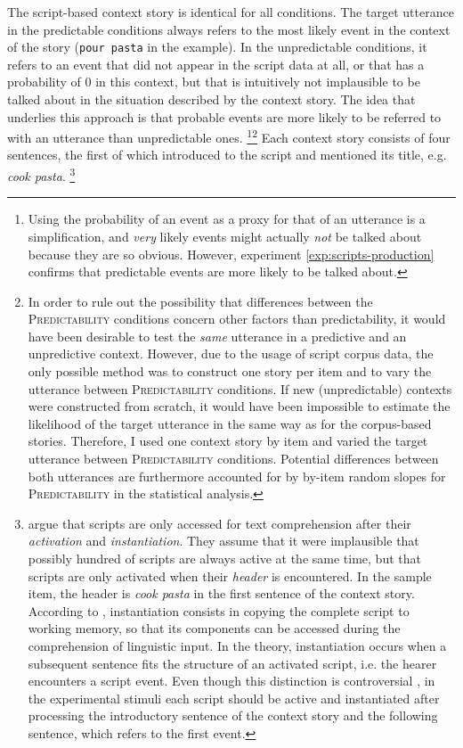 The script-based context story is identical for all conditions. The target utterance in the predictable conditions always refers to the most likely event in the context of the story (\texttt{pour pasta} in the example). In the unpredictable conditions, it refers to an event that did not appear in the script data at all, or that has a probability of 0 in this context, but that is intuitively not implausible to be talked about in the situation described by the context story. The idea that underlies this approach is that probable events are more likely to be referred to with an utterance than unpredictable ones.\largerpage%
%
\footnote{Using the probability of an event as a proxy for that of an utterance is a simplification, and \textit{very} likely events might actually \textit{not} be talked about because they are so obvious. However, experiment \ref{exp:scripts-production} confirms that predictable events are more likely to be talked about.}\footnote{In order to rule out the possibility that differences between the \textsc{Predictability} conditions concern other factors than predictability, it would have been desirable to test the \textit{same} utterance in a predictive and an unpredictive context. However, due to the usage of script corpus data, the only possible method was to construct one story per item and to vary the utterance between \textsc{Predictability} conditions. If new (unpredictable) contexts were constructed from scratch, it would have been impossible to estimate the likelihood of the target utterance in the same way as for the corpus-based stories. Therefore, I used one context story by item and varied the target utterance between \textsc{Predictability} conditions. Potential differences between both utterances are furthermore accounted for by by-item random slopes for \textsc{Predictability} in the statistical analysis.}\afterfn%
%
Each context story consists of four sentences, the first of which introduced to the script and mentioned its title, e.g. \textit{cook pasta}.%
% 
\footnote{\citet{schank.abelson1977} argue that scripts are only accessed for text comprehension after their \textit{activation} and \textit{instantiation}. They assume that it were implausible that possibly hundred of scripts are always active at the same time, but that scripts are only activated when their \textit{header} is encountered. In the sample item, the header is \textit{cook pasta} in the first sentence of the context story. According to \citet[47--48]{schank.abelson1977}, instantiation consists in copying the complete script to working memory, so that its components can be accessed during the comprehension of linguistic input. In the theory, instantiation occurs when a subsequent sentence fits the structure of an activated script, i.e. the hearer encounters a script event. Even though this distinction is controversial \citep[see e.g.][]{rabs.etal2017}, in the experimental stimuli each script should be active and instantiated after processing the introductory sentence of the context story and the following sentence, which refers to the first event.}\afterfn%
